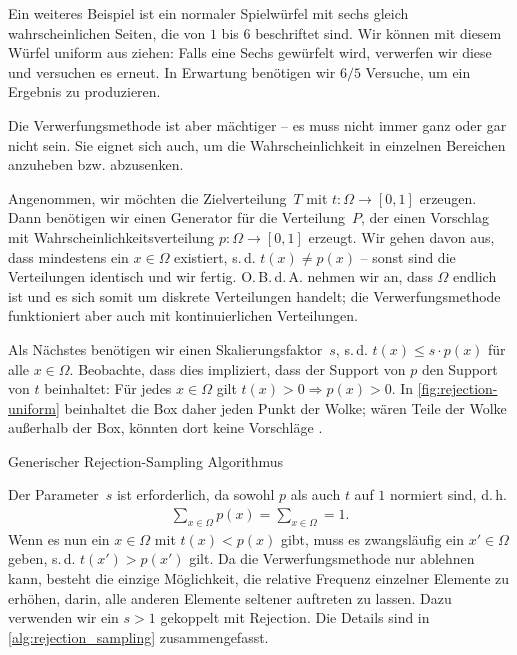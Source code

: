 Ein weiteres Beispiel ist ein normaler Spielwürfel mit sechs gleich wahrscheinlichen Seiten, die von $1$ bis $6$ beschriftet sind.
Wir können mit diesem Würfel uniform aus  ziehen:
Falls eine Sechs gewürfelt wird, verwerfen wir diese und versuchen es erneut.
In Erwartung benötigen wir $6/5$ Versuche, um ein Ergebnis zu produzieren.

Die Verwerfungsmethode ist aber mächtiger -- es muss nicht immer ganz oder gar nicht sein.
Sie eignet sich auch, um die Wahrscheinlichkeit in einzelnen Bereichen anzuheben bzw. abzusenken.

Angenommen, wir möchten die Zielverteilung~$T$ mit $t\colon \Omega \to [0, 1]$ erzeugen.
Dann benötigen wir einen Generator für die Verteilung~$P$, der einen Vorschlag mit Wahrscheinlichkeitsverteilung $p\colon \Omega \to [0, 1]$ erzeugt.
Wir gehen davon aus, dass mindestens ein $x \in \Omega$ existiert, s.\,d. $t(x) \ne p(x)$ -- sonst sind die Verteilungen identisch und wir fertig.
O.\,B.\,d.\,A. nehmen wir an, dass $\Omega$ endlich ist und es sich somit um diskrete Verteilungen handelt; die Verwerfungsmethode funktioniert aber auch mit kontinuierlichen Verteilungen.

Als Nächstes benötigen wir einen Skalierungsfaktor~$s$, s.\,d. $t(x) \le s \cdot p(x)$ für alle $x \in \Omega$.
Beobachte, dass dies impliziert, dass der Support von $p$ den Support von $t$ beinhaltet:
Für jedes $x\in \Omega$ gilt $t(x) > 0 \Rightarrow p(x) > 0$.
In \cref{fig:rejection-uniform} beinhaltet die Box daher jeden Punkt der Wolke; wären Teile der Wolke außerhalb der Box, könnten dort keine Vorschläge .

\begin{algorithm}[t]
    \caption{Generischer Rejection-Sampling Algorithmus}
    \label{alg:rejection_sampling}
\end{algorithm}

Der Parameter~$s$ ist erforderlich, da sowohl $p$ als auch $t$ auf $1$ normiert sind, d.\,h.
\begin{align}
    \sum_{x \in \Omega} p(x) = \sum_{x \in \Omega} = 1.
\end{align}
Wenn es nun ein $x \in \Omega$ mit $t(x) < p(x)$ gibt, muss es zwangsläufig ein $x' \in \Omega$ geben, s.\,d. $t(x') > p(x')$ gilt.
Da die Verwerfungsmethode nur ablehnen kann, besteht die einzige Möglichkeit, die relative Frequenz einzelner Elemente zu erhöhen, darin, alle anderen Elemente seltener auftreten zu lassen.
Dazu verwenden wir ein $s > 1$ gekoppelt mit  Rejection.
Die Details sind in \cref{alg:rejection_sampling} zusammengefasst.

